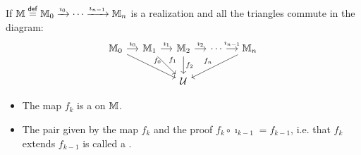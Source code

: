 \begin{frame}
\begin{definition}
If \( \mathbb{M}\stackrel{\mathsf{def}}{=} \mathbb{M}_0\xrightarrow[]{\imath_0}\cdots\xrightarrow[]{\imath_{n-1}}\mathbb{M}_n \) is a realization and all the triangles commute in the diagram:\vspace{-10pt}
\[\begin{tikzcd}[ampersand replacement=\&, column sep=small]
  {\mm_0} \& {\mm_1} \& {\mm_2} \& \cdots \& {\mm_n} \\
\&\& {\mathcal{U}}
\arrow["{\imath_0}", from=1-1, to=1-2]
\arrow["{f_0}", from=1-1, to=2-3]
\arrow["{\imath_1}", from=1-2, to=1-3]
\arrow["{f_1}", from=1-2, to=2-3]
\arrow["{\imath_2}", from=1-3, to=1-4]
\arrow["{f_2}", from=1-3, to=2-3]
\arrow["{\imath_{n-1}}", from=1-4, to=1-5]
\arrow["f_n"', from=1-5, to=2-3]
\end{tikzcd}\]\vspace{-15pt}
\begin{itemize}
\item The map \( f_k \) is a  on \( \mathbb{M} \).
\item The pair given by the map \( f_k \) and the proof \( f_k\circ \imath_{k-1}=f_{k-1} \), i.e. that \( f_k \) extends \( f_{k-1} \) is called a .
\end{itemize}
\end{definition}
\end{frame}

